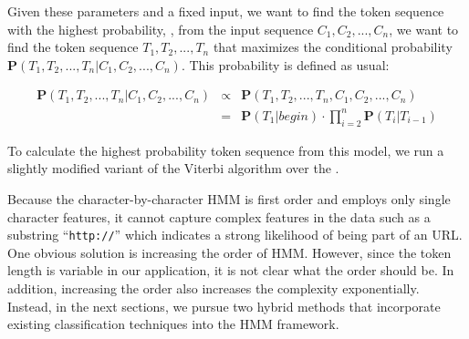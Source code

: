 Given these parameters and a fixed input, we want to find the token
sequence with the highest probability, \ie{}, from the input sequence 
$C_1, C_2, ..., C_n$, we want to find the token sequence 
$T_1, T_2, ..., T_n$ 
that maximizes the conditional probability
$\mathbf{P}(T_1, T_2, ..., T_n|C_1, C_2, ..., C_n)$.
This probability is defined as usual:

\begin{eqnarray}
\mathbf{P}(T_1, T_2, ..., T_n|C_1, C_2, ..., C_n) & \propto & \mathbf{P}(T_1, T_2, ..., T_n, C_1, C_2, ..., C_n) \nonumber \\
& = & \mathbf{P}(T_1|begin) \cdot
\prod_{i=2}^{n}{\mathbf{P}(T_i|T_{i-1})}
\end{eqnarray}

To calculate the highest probability token sequence from this
model, we run a slightly modified variant of the Viterbi 
algorithm over the \seqset.

Because the character-by-character HMM is first order and employs only 
single character features, it cannot capture complex features
in the data such as  
a substring ``{\tt http://}'' which indicates a strong likelihood 
of being part of an URL.
One obvious solution is increasing the order of HMM.  However, since
the token length is variable in our application, it is not clear what
the order should be.  In addition, increasing the order also increases
the complexity exponentially.  Instead, in the next sections, we pursue
two hybrid methods that incorporate existing classification techniques
into the HMM framework.

